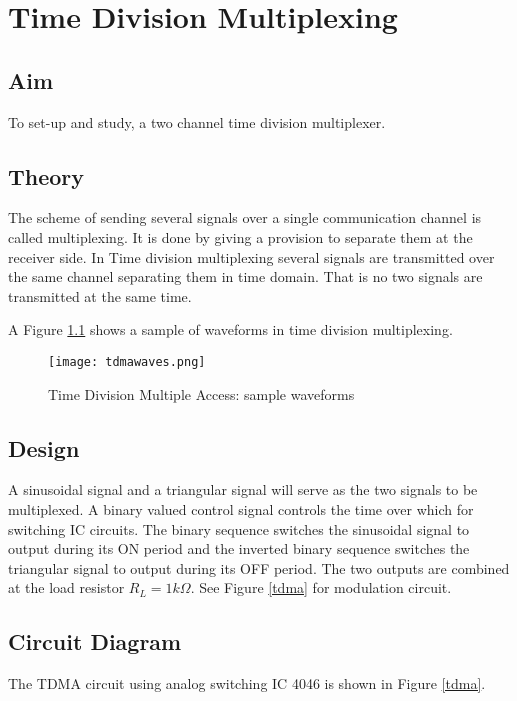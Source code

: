 \chapter[Time Division Multiplexing]{Time Division Multiplexing}

\section*{Aim}
To set-up and study, a two channel time division multiplexer.
\section*{Theory}

The scheme of sending several signals over a single communication channel is called multiplexing. It is done by  giving a provision to separate them at the receiver side. In Time division multiplexing several signals are transmitted over the same channel separating them in time domain. That is no two signals are transmitted at the same time.

A Figure \ref{tdmawaveforms} shows a sample of waveforms in time division multiplexing.

\begin{figure}[h]
	\centering
	\texttt{[image: tdmawaves.png]}
	\caption{Time Division Multiple Access: sample waveforms}
	\label{tdmawaveforms}
\end{figure}


\section*{Design}

A sinusoidal signal and a triangular signal  will serve as the two signals to be multiplexed. A binary  valued control signal controls the time over which for switching IC circuits. The binary sequence switches the sinusoidal signal to output during its ON period and the inverted binary sequence switches the triangular signal to output during its OFF period. The two outputs are combined at the load resistor $R_L =1 k\Omega$. See Figure \ref{tdma} for modulation circuit.


\section*{Circuit Diagram}

The TDMA circuit using analog switching IC 4046 is shown in Figure \ref{tdma}.

